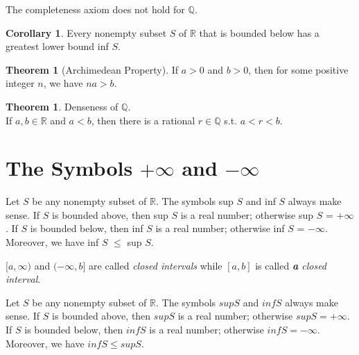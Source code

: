 \documentclass{book}
\theoremstyle{definition}
\newtheorem{theorem}[definition]{Theorem}
\newtheorem{corollary}[definition]{Corollary}
\begin{document}
The completeness axiom does not hold for $\mathbb{Q}$.
\begin{corollary}
Every nonempty subset $S$ of $\mathbb{R}$ that is bounded below has a greatest lower bound inf $S$.
\end{corollary}
\begin{theorem}[Archimedean Property]
If $a > 0$ and $b > 0$, then for some positive integer $n$, we have $na > b$.
\end{theorem}
\begin{theorem}
Denseness of $\mathbb{Q}$.
\\ If $a,b \in \mathbb{R}$ and $a < b$, then there is a rational $r \in \mathbb{Q}$ s.t. $a < r < b$.
\end{theorem}
\section{The Symbols $+\infty$ and $-\infty$}
Let $S$ be any nonempty subset of $\mathbb{R}$. The symbols sup $S$ and inf $S$ always make sense. If $S$ is bounded above, then sup $S$ is a real number; otherwise sup $S$ = $+\infty$. If $S$ is bounded below, then inf $S$ is a real number; otherwise inf $S$ = $-\infty$. Moreover, we have inf $S$ $\leq$ sup $S$.

$[a, \infty)$ and $(-\infty, b]$ are called \textit{closed intervals} while $[a, b]$ is called \textit{\textbf{a} closed interval}.

Let $S$ be any nonempty subset of $\mathbb{R}$. The symbols $sup S$ and $inf S$ always make sense. If $S$ is bounded above, then $sup S$ is a real number; otherwise $supS=+\infty$. If $S$ is bounded below, then $inf S$ is a real number; otherwise $inf S= -\infty$. Moreover, we have $inf S \leq sup S$.


% 
\end{document}
